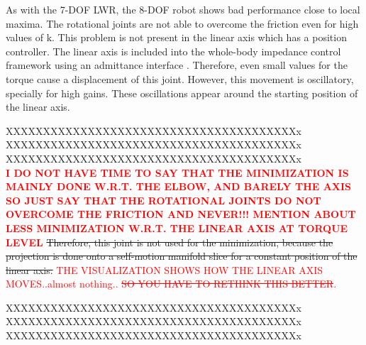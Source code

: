  As with the 7-DOF LWR, the 8-DOF robot shows bad performance close to local maxima. The rotational joints are not able to overcome the friction even for high values of $\mathrm{k}$. This problem is not present in the linear axis which has a position controller. The linear axis is included into the whole-body impedance control framework using an admittance interface \cite{whole_body_imp}. Therefore, even small values for the torque cause a displacement of this joint.
  However, this movement is oscillatory, specially for high gains. These oscillations appear around the starting position of the linear axis.
  
  XXXXXXXXXXXXXXXXXXXXXXXXXXXXXXXXXXXXXXXx \\
    XXXXXXXXXXXXXXXXXXXXXXXXXXXXXXXXXXXXXXXx \\
      XXXXXXXXXXXXXXXXXXXXXXXXXXXXXXXXXXXXXXXx \\
 \textcolor{red}{   \textbf{  I DO NOT HAVE TIME TO SAY THAT THE MINIMIZATION IS MAINLY DONE W.R.T. THE ELBOW, AND BARELY THE AXIS SO JUST SAY THAT THE ROTATIONAL JOINTS DO NOT OVERCOME THE FRICTION AND NEVER!!! MENTION ABOUT LESS MINIMIZATION W.R.T. THE LINEAR AXIS AT TORQUE LEVEL}}
       \st{Therefore, this joint is not used for the minimization, because the projection is done onto a self-motion manifold slice for a constant position of the linear axis.} \textcolor{red}{THE VISUALIZATION SHOWS HOW THE LINEAR AXIS MOVES..almost nothing.. \st{SO YOU HAVE TO RETHINK THIS BETTER}.}

  XXXXXXXXXXXXXXXXXXXXXXXXXXXXXXXXXXXXXXXx \\
  XXXXXXXXXXXXXXXXXXXXXXXXXXXXXXXXXXXXXXXx \\
  XXXXXXXXXXXXXXXXXXXXXXXXXXXXXXXXXXXXXXXx \\





